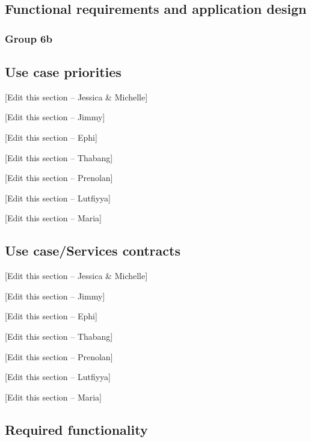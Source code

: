\documentclass[11pt]{article}
\author{user}
\title{}
\begin{document}
\begin{center}
\section{Functional requirements and application design}
\end{center}


\subsubsection{Group 6b}


{\raggedright
\subsection{Use case priorities}
}

{\raggedright
[Edit this section -- Jessica \& Michelle]
}

{\raggedright
[Edit this section -- Jimmy]
}

{\raggedright
[Edit this section -- Ephi]
}

{\raggedright
[Edit this section -- Thabang]
}

{\raggedright
[Edit this section -- Prenolan]
}

{\raggedright
[Edit this section -- Lutfiyya]
}

{\raggedright
[Edit this section -- Maria]
}

{\raggedright
\subsection{Use case/Services contracts}
}

{\raggedright
[Edit this section -- Jessica \& Michelle]
}

{\raggedright
[Edit this section -- Jimmy]
}

{\raggedright
[Edit this section -- Ephi]
}

{\raggedright
[Edit this section -- Thabang]
}

{\raggedright
[Edit this section -- Prenolan]
}

{\raggedright
[Edit this section -- Lutfiyya]
}

{\raggedright
[Edit this section -- Maria]
}

{\raggedright
\subsection{Required functionality}
}
\end{document}
